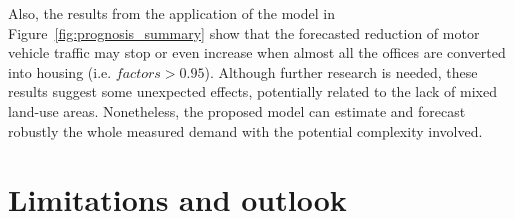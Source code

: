 Also, the results from the application of the model in Figure~\ref{fig:prognosis_summary} show that the forecasted reduction of motor vehicle traffic may stop or even increase when almost all the offices are converted into housing (i.e. $\textit{factors}>0.95$). Although further research is needed, these results suggest some unexpected effects, potentially related to the lack of mixed land-use areas.
Nonetheless, the proposed model can estimate and forecast robustly the whole measured demand with the potential complexity involved. 

\section{Limitations and outlook}
\label{sec:ETRCO2H_Limitations}



